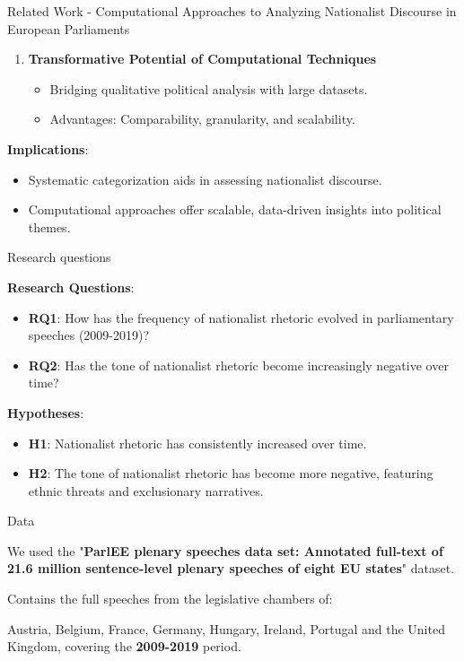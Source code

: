 \documentclass[8pt]{beamer}
\begin{document}
\begin{frame}{Related Work - Computational Approaches to Analyzing
Nationalist Discourse in European Parliaments}
\begin{enumerate}
    \item \textbf{Transformative Potential of Computational Techniques}
    \begin{itemize}
        \item Bridging qualitative political analysis with large datasets.
        \item Advantages: Comparability, granularity, and scalability.
    \end{itemize}
\end{enumerate}

\textbf{Implications}:
\begin{itemize}
    \item Systematic categorization aids in assessing nationalist discourse.
    \item Computational approaches offer scalable, data-driven insights into political themes.
\end{itemize}

\end{frame}

\begin{frame}{Research questions}

\textbf{Research Questions}:

\begin{itemize}
    \item \textbf{RQ1}: How has the frequency of nationalist rhetoric evolved in parliamentary speeches (2009-2019)?
    \item \textbf{RQ2}: Has the tone of nationalist rhetoric become increasingly negative over time?
\end{itemize}

\textbf{Hypotheses}:

\begin{itemize}
    \item \textbf{H1}: Nationalist rhetoric has consistently increased over time.
    \item \textbf{H2}: The tone of nationalist rhetoric has become more negative, featuring ethnic threats and exclusionary narratives.
\end{itemize}
    
\end{frame}

\begin{frame}{Data}

    We used the  "\textbf{ParlEE plenary speeches data set: Annotated full-text of 21.6 million sentence-level plenary speeches of eight EU states}" \cite{sylvester2022parlee} dataset.

    Contains the full speeches from the legislative chambers of:  

    Austria, Belgium, France, Germany, Hungary, Ireland, Portugal and the United Kingdom, covering the \textbf{2009-2019} period.  

    
\end{frame}
\end{document}
